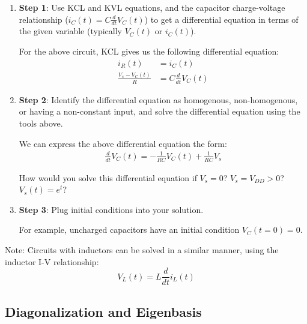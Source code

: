 \begin{enumerate}
    \item \textbf{Step 1}: Use KCL and KVL equations, and the capacitor charge-voltage relationship ($i_C(t) = C \frac{d}{dt} V_C(t)$) to get a differential equation in terms of the given variable (typically $V_C(t)$ or $i_C(t)$).
    
    For the above circuit, KCL gives us the following differential equation:
    \begin{align*}
        i_R(t) &= i_C(t) \\
        \frac{V_s - V_C(t)}{R} &= C \frac{d}{dt} V_C(t)
    \end{align*}

    \item \textbf{Step 2}: Identify the differential equation as homogenous, non-homogenous, or having a non-constant input, and solve the differential equation using the tools above.

    We can express the above differential equation the form:
    \begin{align*}
        \frac{d}{dt} V_C(t) = -\frac{1}{RC} V_C(t) + \frac{1}{RC} V_s
    \end{align*}

    How would you solve this differential equation if $V_s = 0$? $V_s = V_{DD} > 0$? $V_s(t) = e^{t}$?

    \item \textbf{Step 3}: Plug initial conditions into your solution.

    For example, uncharged capacitors have an initial condition $V_C(t = 0) = 0$.
\end{enumerate}

Note: Circuits with inductors can be solved in a similar manner, using the inductor I-V relationship: 
$$\boxed{V_L(t) = L \frac{d}{dt} i_L(t)}$$

\newpage
\subsection*{Diagonalization and Eigenbasis}

